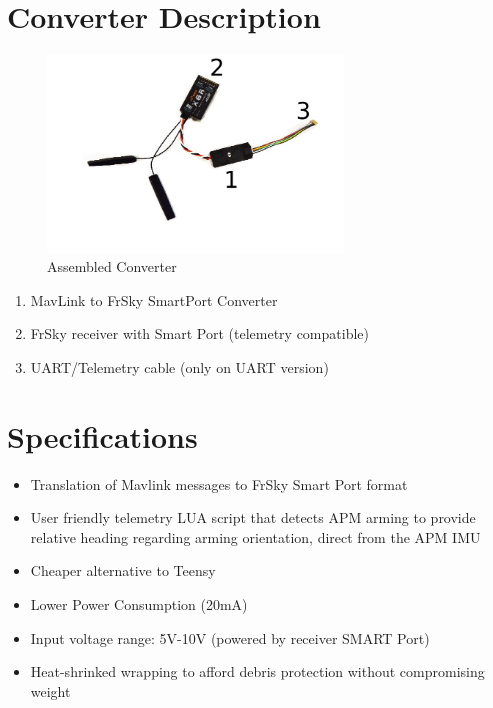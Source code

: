 \documentclass[english]{article}
\begin{document}
\section{Converter Description}

\begin{figure}[h!]
        \centering
        \includegraphics[width=0.7\textwidth]{Assembled Converter}
	\caption{Assembled Converter}
\end{figure}

\begin{enumerate}

\item MavLink to FrSky SmartPort Converter
\item FrSky receiver with Smart Port (telemetry compatible)
\item UART/Telemetry cable (only on UART version)

\end{enumerate}

\section{Specifications}

\begin{itemize}

\item Translation of Mavlink messages to FrSky Smart Port format
\item User friendly telemetry LUA script that detects APM arming to provide relative heading regarding arming orientation, direct from the APM IMU
\item Cheaper alternative to Teensy
\item Lower Power Consumption (20mA)
\item Input voltage range: 5V-10V (powered by receiver SMART Port)
\item Heat-shrinked wrapping to afford debris protection without compromising weight

\end{itemize}
\end{document}
